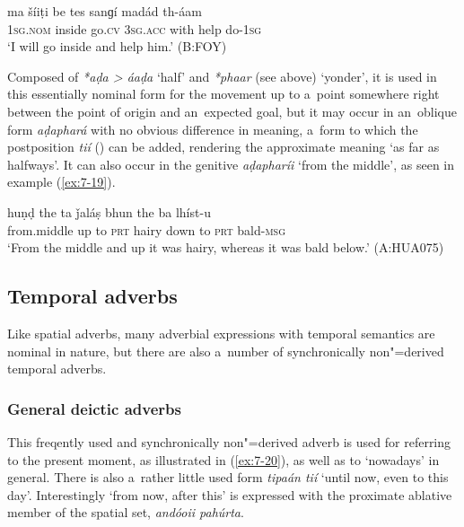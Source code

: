 \begin{exe}
\ex
\label{ex:7-18}
\gll ma šíiṭi be tes sanɡí madád th-áam \\
\textsc{1sg.nom} inside go.\textsc{cv} \textsc{3sg.acc} with help do-\textsc{1sg}\\
\glt `I will go inside and help him.' (B:FOY)
\end{exe}

 Composed of \textit{*aḍa {\textgreater} áaḍa} `half' and \textit{*phaar} (see above) `yonder', it is used in this essentially nominal form for the movement up to a~point somewhere right between the point of origin and an~expected goal, but it may occur in an~oblique form \textit{aḍaphará} with no obvious difference in meaning, a~form to which the postposition \textit{tií} () can be added, rendering the approximate meaning `as far as halfways'. It can also occur in the genitive \textit{aḍapharíi} `from the middle', as seen in example (\ref{ex:7-19}). 
\begin{exe}
\ex
\label{ex:7-19}
\gll [aḍapharíi] huṇḍ the ta ǰaláṣ bhun the  ba lhíst-u \\
from.middle up to \textsc{prt} hairy down  to \textsc{prt} bald-\textsc{msg}\\
\glt `From the middle and up it was hairy, whereas it was bald below.' (A:HUA075)
\end{exe}

\subsection{Temporal adverbs}
\label{subsec:7-1-3}

Like spatial adverbs, many adverbial expressions with temporal semantics are nominal in nature, but there are also a~number of synchronically non"=derived temporal adverbs.

\subsubsection*{General deictic adverbs}

 This freqently used and synchronically non"=derived adverb is
used for referring to the present moment, as illustrated in (\ref{ex:7-20}), as well as to
`nowadays' in general. There is also a~rather little used form \textit{tipaán tií} `until
now, even to this day'. Interestingly `from now, after this' is expressed with the proximate
ablative member of the spatial set, \textit{andóoii pahúrta}.

